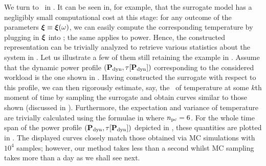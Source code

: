We turn to \ in .
It can be seen in, for example,  that the surrogate model has a negligibly small computational cost at this stage: for any outcome of the parameters $\boldsymbol{\xi} \equiv \boldsymbol{\xi}(\omega)$, we can easily compute the corresponding temperature by plugging in $\boldsymbol{\xi}$ into ; the same applies to power.
Hence, the constructed representation can be trivially analyzed to retrieve various statistics about the system in .
Let us illustrate a few of them still retaining the example in .
Assume that the dynamic power profile $\profilePdyn$ corresponding to the considered workload is the one shown in .
Having constructed the surrogate with respect to this profile, we can then rigorously estimate, say, the \pdf\ of temperature at some $k$th moment of time by sampling the surrogate and obtain curves similar to those shown  (discussed in ).
Furthermore, the expectation and variance of temperature are trivially calculated using the formulae in  where ${n_\text{pc}} = 6$.
For the whole time span of the power profile $\profilePdyn$ depicted in , these quantities are plotted in .
The displayed curves closely match those obtained via MC simulations with $10^4$ samples; however, our method takes less than a second whilst MC sampling takes more than a day as we shall see next.


